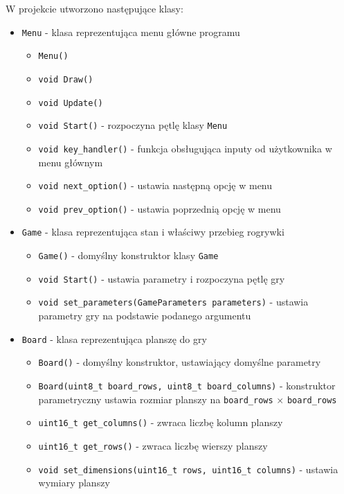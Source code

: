 \documentclass{article}
\begin{document}
W projekcie utworzono następujące klasy:
\begin{itemize}
    \item \texttt{Menu} - klasa reprezentująca menu główne programu
        \begin{itemize}
            \item \texttt{Menu()}
            \item \texttt{void Draw()}
            \item \texttt{void Update()}
            \item \texttt{void Start()} - rozpoczyna pętlę klasy \texttt{Menu}
            \item \texttt{void key\_handler()} - funkcja obsługująca inputy od użytkownika w menu głównym
            \item \texttt{void next\_option()} - ustawia następną opcję w menu
            \item \texttt{void prev\_option()} - ustawia poprzednią opcję w menu
        \end{itemize}

    \item \texttt{Game} - klasa reprezentująca stan i właściwy przebieg rogrywki
        \begin{itemize}
            \item \texttt{Game()} - domyślny konstruktor klasy \texttt{Game}
            \item \texttt{void Start()} - ustawia parametry i rozpoczyna pętlę gry
            \item \texttt{void set\_parameters(GameParameters parameters)} - ustawia parametry gry na podstawie podanego argumentu
        \end{itemize}

    \item \texttt{Board} - klasa reprezentująca planszę do gry
        \begin{itemize}
            \item \texttt{Board()} - domyślny konstruktor, ustawiający domyślne parametry
            \item \texttt{Board(uint8\_t board\_rows, uint8\_t board\_columns)} - konstruktor parametryczny ustawia rozmiar planszy na \texttt{board\_rows} $\times$ \texttt{board\_rows}
            \item \texttt{uint16\_t get\_columns()} - zwraca liczbę kolumn planszy
            \item \texttt{uint16\_t get\_rows()} - zwraca liczbę wierszy planszy
            \item \texttt{void set\_dimensions(uint16\_t rows, uint16\_t columns)} - ustawia wymiary planszy
        \end{itemize}
\end{itemize}
     
\end{document}
